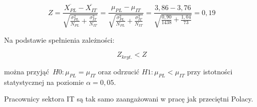 \begin{equation}
  Z = \frac{\overline{X_{PL}} - \overline{X_{IT}}}{\sqrt{\frac{\sigma^2_{PL}}{N_{PL}}+\frac{\sigma^2_{IT}}{N_{IT}}}} = \frac{\mu_{PL} - \mu_{IT}}{\sqrt{\frac{\sigma^2_{PL}}{N_{PL}}+\frac{\sigma^2_{IT}}{N_{IT}}}} = \frac{3,86- 3,76}{\sqrt{\frac{0,90}{1438}+\frac{1,04}{73}}} = 0,19
\end{equation}

Na podstawie spełnienia zależności:

\begin{equation}
  Z_{kryt.} < Z
\end{equation}

można przyjąć $H0: \mu_{PL} = \mu_{IT}$ oraz odrzucić $H1: \mu_{PL} < \mu_{IT}$ przy istotności statystycznej na poziomie $\alpha = 0,05$.

Pracownicy sektora IT są tak samo zaangażowani w pracę jak przeciętni Polacy.

